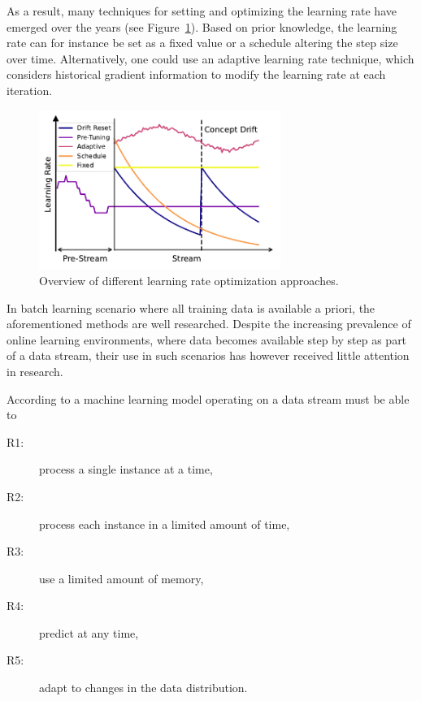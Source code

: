 \documentclass[runningheads]{llncs}
\begin{document}
As a result, many techniques for setting and optimizing the learning rate have emerged over the years (see Figure~\ref{fig:lr_overview}).
Based on prior knowledge, the learning rate can for instance be set as a fixed value or a schedule altering the step size over time.
Alternatively, one could use an adaptive learning rate technique, which considers historical gradient information to modify the learning rate at each iteration.

\begin{figure}[ht]
	\centering
	\includegraphics[width=0.7\textwidth]{figures/lr_overview.pdf}
	\caption{Overview of different learning rate optimization approaches.}
	\label{fig:lr_overview}
\end{figure}
In batch learning scenario where all training data is available a priori, the aforementioned methods are well researched.
Despite the increasing prevalence of online learning environments, where data becomes available step by step as part of a data stream, their use in such scenarios has however received little attention in research.

According to \textcite{bifetMOAMassiveOnline2010} a machine learning model operating on a data stream must be able to
\begin{center}
	\begin{description}
		\item[R1:] process a single instance at a time,\label{rq:single_instance}
		\item[R2:] process each instance in a limited amount of time,\label{rq:limited_time}
		\item[R3:] use a limited amount of memory,\label{rq:limited_memory}
		\item[R4:] predict at any time,\label{rq:predict_any_time}
		\item[R5:] adapt to changes in the data distribution.\label{rq:adapt_to_drift}
	\end{description}
\end{center}
\end{document}

